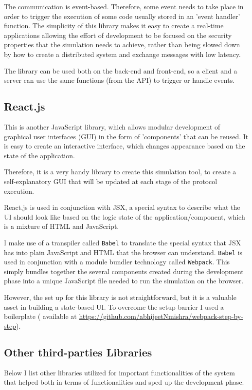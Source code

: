 The communication is event-based. Therefore, some event needs to take place in order to trigger the execution of some code usually stored in an 'event handler' function.
The simplicity of this library makes it easy to create a real-time applications allowing the effort of development to be focused on the security properties that the simulation needs to achieve, rather than being slowed down by how to create a distributed system and exchange messages with low latency.

The library can be used both on the back-end and front-end, so a client and a server can use the same functions (from the API) to trigger or handle events.


\subsection{React.js}
This is another JavaScript library, which allows modular development of graphical user interfaces (GUI) in the form of 'components' that can be reused. It is easy to create an interactive interface, which changes appearance based on the state of the application.

Therefore, it is a very handy library to create this simulation tool, to create a self-explanatory GUI that will be updated at each stage of the protocol execution.

React.js is used in conjunction with JSX, a special syntax to describe what the UI should look like based on the logic state of the application/component, which is a mixture of HTML and JavaScript.

I make use of a transpiler called \lstinline{Babel} to translate the special syntax that JSX has into plain JavaScript and HTML that the browser can understand. \lstinline{Babel} is used in conjunction with a module bundler technology called \lstinline{Webpack}. This simply bundles together the several components created during the development phase into a unique JavaScript file needed to run the simulation on the browser.

However, the set up for this library is not straightforward, but it is a valuable asset in building a state-based UI. To overcome the setup barrier I used a boilerplate ( available at \url{https://github.com/abhijeetNmishra/webpack-step-by-step}).

\subsection{Other third-parties Libraries}
Below I list other libraries utilized for important functionalities of the system that helped both in terms of functionalities and sped up the development phase.

